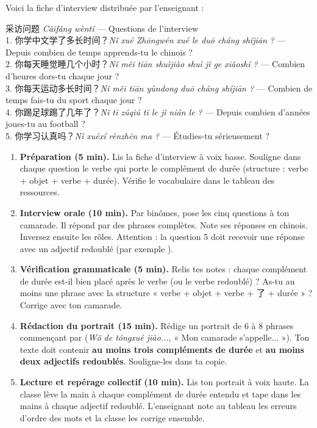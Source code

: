 \documentclass[11pt]{article}
\newcounter{popsec}
\newcounter{popsub}
\newcommand{\courssub}[1]{%
  \stepcounter{popsub}%
  \par\vspace{9pt}\noindent{\popxbold\fontsize{11.5}{13}\selectfont\color{popink}{\color{poporange}\thepopsec.\thepopsub}\hspace{6pt}#1}\par\nopagebreak\vspace{4pt}
}
\newcommand{\zh}[1]{\ifmmode\text{#1}\else{#1}\fi}
\begin{document}
Voici la fiche d'interview distribuée par l'enseignant :

\begin{textebox}
采访问题 \emph{Cǎifǎng wèntí} — Questions de l'interview\\
1. 你学中文学了多长时间？\emph{Nǐ xué Zhōngwén xué le duō cháng shíjiān ?} — Depuis combien de temps apprends-tu le chinois ?\\
2. 你每天睡觉睡几个小时？\emph{Nǐ měi tiān shuìjiào shuì jǐ ge xiǎoshí ?} — Combien d'heures dors-tu chaque jour ?\\
3. 你每天运动多长时间？\emph{Nǐ měi tiān yùndong duō cháng shíjiān ?} — Combien de temps fais-tu du sport chaque jour ?\\
4. 你踢足球踢了几年了？\emph{Nǐ tī zúqiú tī le jǐ nián le ?} — Depuis combien d'années joues-tu au football ?\\
5. 你学习认真吗？\emph{Nǐ xuéxí rènzhēn ma ?} — Étudies-tu sérieusement ?
\end{textebox}

\courssub{Consignes}

\begin{enumerate}
\item \textbf{Préparation (5 min).} Lis la fiche d'interview à voix basse. Souligne dans chaque question le verbe qui porte le complément de durée (structure : verbe + objet + verbe + durée). Vérifie le vocabulaire dans le tableau des ressources.
\item \textbf{Interview orale (10 min).} Par binômes, pose les cinq questions à ton camarade. Il répond par des phrases complètes. Note ses réponses en chinois. Inversez ensuite les rôles. Attention : la question 5 doit recevoir une réponse avec un adjectif redoublé (par exemple \zh{认认真真}).
\item \textbf{Vérification grammaticale (5 min).} Relis tes notes : chaque complément de durée est-il bien placé après le verbe (ou le verbe redoublé) ? As-tu au moins une phrase avec la structure « verbe + objet + verbe + 了 + durée » ? Corrige avec ton camarade.
\item \textbf{Rédaction du portrait (15 min).} Rédige un portrait de 6 à 8 phrases commençant par \zh{我的同学叫……} (\emph{Wǒ de tóngxué jiào...}, « Mon camarade s'appelle... »). Ton texte doit contenir \textbf{au moins trois compléments de durée} et \textbf{au moins deux adjectifs redoublés}. Souligne-les dans ta copie.
\item \textbf{Lecture et repérage collectif (10 min).} Lis ton portrait à voix haute. La classe lève la main à chaque complément de durée entendu et tape dans les mains à chaque adjectif redoublé. L'enseignant note au tableau les erreurs d'ordre des mots et la classe les corrige ensemble.
\end{enumerate}
\end{document}
